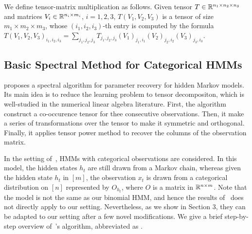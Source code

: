 We define tensor-matrix multiplication as follows. Given tensor $T \in \mathbb{R}^{n_1 \times n_2 \times n_3}$ and matrices $V_i \in \mathbb{R}^{n_i \times m_i}$, $i = 1,2,3$, $T(V_1, V_2, V_3)$ is a tensor of size $m_1 \times m_2 \times m_3$, whose $(i_1, i_2, i_3)$-th entry is computed by the formula $T(V_1, V_2, V_3)_{i_1, i_2, i_3} = \sum_{j_1, j_2, j_3} T_{j_1, j_2, j_3} (V_1)_{j_1,i_1} (V_2)_{j_2, i_2} (V_3)_{j_3,i_3}$.


\subsection{Basic Spectral Method for Categorical HMMs}
\cite{AGHKT12} proposes a spectral algorithm for parameter recovery for hidden Markov models. Its main idea is to reduce the learning problem to tensor decompositon, which is well-studied in the numerical linear algebra literature. First, the algorithm construct a co-occurence tensor for thee consecutive observations. Then, it make a series of transformations over the tensor to make it symmetric and orthogonal. Finally, it applies tensor power method to recover the columns of the observation matrix.

In the setting of~\cite{AGHKT12}, HMMs with categorical observations are considered. In this model, the hidden states $h_t$ are still drawn from a Markov chain, whereas given the hidden state $h_t$ in $[m]$, the observation $x_t$ is drawn from a categorical distribution on $[n]$ represented by $O_{h_t}$, where $O$ is a matrix in $\mathbb{R}^{n \times m}$.
Note that the model is not the same as our binomial HMM, and hence the results of~\cite{AGHKT12} does not directly apply to our setting. Nevertheless, as we show in Section 3, they can be adapted to our setting after a few novel modifications. We give a brief step-by-step overview of~\cite{AGHKT12}'s algorithm, abbreviated as \TD.

